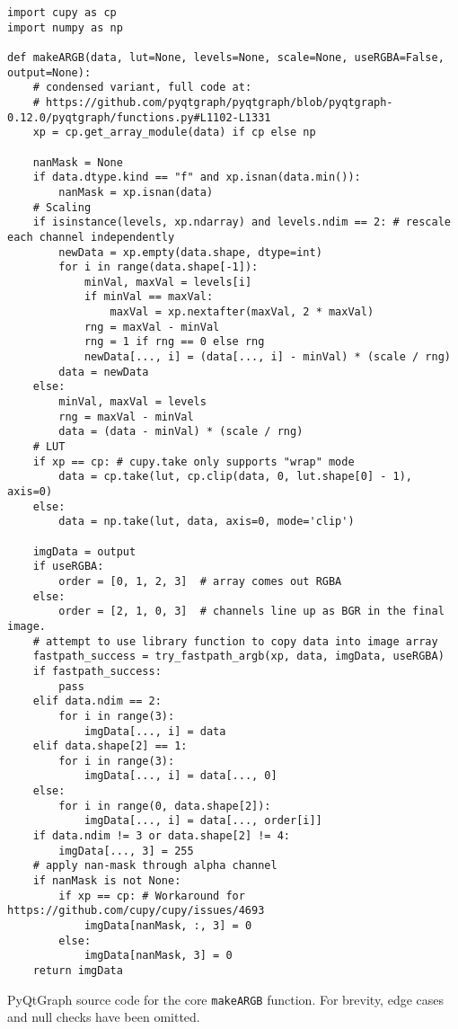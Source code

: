 \begin{table*}[!tbh]
\begin{verbatim}
import cupy as cp
import numpy as np

def makeARGB(data, lut=None, levels=None, scale=None, useRGBA=False, output=None):
    # condensed variant, full code at:
    # https://github.com/pyqtgraph/pyqtgraph/blob/pyqtgraph-0.12.0/pyqtgraph/functions.py#L1102-L1331
    xp = cp.get_array_module(data) if cp else np

    nanMask = None
    if data.dtype.kind == "f" and xp.isnan(data.min()):
        nanMask = xp.isnan(data)
    # Scaling
    if isinstance(levels, xp.ndarray) and levels.ndim == 2: # rescale each channel independently
        newData = xp.empty(data.shape, dtype=int)
        for i in range(data.shape[-1]):
            minVal, maxVal = levels[i]
            if minVal == maxVal:
                maxVal = xp.nextafter(maxVal, 2 * maxVal)
            rng = maxVal - minVal
            rng = 1 if rng == 0 else rng
            newData[..., i] = (data[..., i] - minVal) * (scale / rng)
        data = newData
    else:
        minVal, maxVal = levels
        rng = maxVal - minVal
        data = (data - minVal) * (scale / rng)
    # LUT
    if xp == cp: # cupy.take only supports "wrap" mode
        data = cp.take(lut, cp.clip(data, 0, lut.shape[0] - 1), axis=0)
    else:
        data = np.take(lut, data, axis=0, mode='clip')

    imgData = output
    if useRGBA:
        order = [0, 1, 2, 3]  # array comes out RGBA
    else:
        order = [2, 1, 0, 3]  # channels line up as BGR in the final image.
    # attempt to use library function to copy data into image array
    fastpath_success = try_fastpath_argb(xp, data, imgData, useRGBA)
    if fastpath_success:
        pass
    elif data.ndim == 2:
        for i in range(3):
            imgData[..., i] = data
    elif data.shape[2] == 1:
        for i in range(3):
            imgData[..., i] = data[..., 0]
    else:
        for i in range(0, data.shape[2]):
            imgData[..., i] = data[..., order[i]]
    if data.ndim != 3 or data.shape[2] != 4:
        imgData[..., 3] = 255
    # apply nan-mask through alpha channel
    if nanMask is not None:
        if xp == cp: # Workaround for https://github.com/cupy/cupy/issues/4693
            imgData[nanMask, :, 3] = 0
        else:
            imgData[nanMask, 3] = 0
    return imgData
\end{verbatim}
\caption{PyQtGraph source code for the core \texttt{makeARGB} function. For brevity, edge cases and null checks have been omitted.}
\label{table:makeARGB}
\end{table*}

